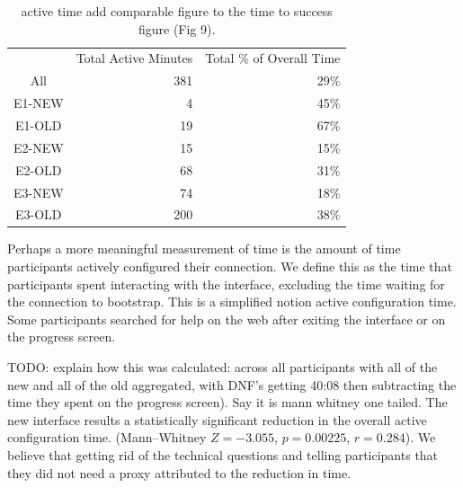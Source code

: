 \documentclass[USenglish,oneside,twocolumn]{article}
\begin{document}

\begin{table}
\centering
	\begin{tabular}{c r r}
	 & Total Active Minutes & Total \% of Overall Time \\
	\noalign{\hrule}
	All & 381 & 29\% \\ 
	E1-NEW & 4 & 45\% \\
	E1-OLD & 19 & 67\% \\
	E2-NEW & 15 & 15\% \\
	E2-OLD & 68 & 31\% \\
	E3-NEW & 74 & 18\% \\
	E3-OLD & 200 & 38\% \\
	\end{tabular}
\caption{active time {\color {red} add comparable figure to the time to success figure (Fig 9)}.} 
\label{table:active_time}
\end{table}

Perhaps a more meaningful measurement of time is the amount of time participants actively configured their connection. We define this as the time that participants spent interacting with the interface, excluding the time waiting for the connection to bootstrap. This is a simplified notion active configuration time. Some participants searched for help on the web after exiting the interface or on the progress screen. 

{\color {red} TODO: explain how this was calculated: across all participants with all of the new and all of the old aggregated, with DNF's getting 40:08 then subtracting the time they spent on the progress screen). Say it is mann whitney one tailed. } The new interface results a statistically significant reduction in the overall active configuration time. (Mann--Whitney $Z = -3.055$, $p = 0.00225$, $r= 0.284$). We believe that getting rid of the technical questions and telling participants that they did not need a proxy attributed to the reduction in time. 
\end{document}
